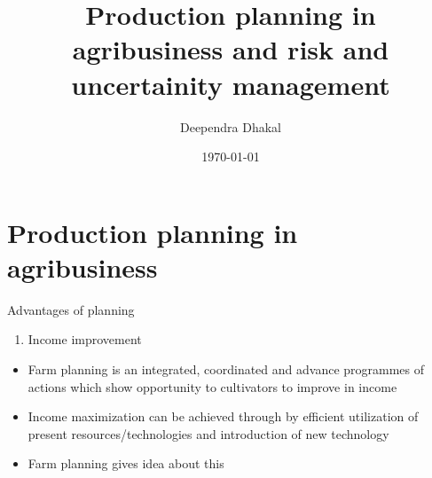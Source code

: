 \documentclass[12pt,ignorenonframetext,aspectratio=169]{beamer}
\title{\insertsectionhead}
  {
    \definecolor{white}{rgb}{0.776,0.357,0.157}
    \definecolor{iqss@orange}{rgb}{1,1,1}
    \ifnum \insertmainframenumber > \insertframenumber
    \frame{
      \frametitle{\iqsssectiontitleheader}
      \tableofcontents[currentsection]
    }
    \else
    \frame{
      \frametitle{Backup Slides}
      \tableofcontents[sectionstyle=shaded/shaded,subsectionstyle=shaded/shaded/shaded]
    }
    \fi
  }
\title[]{Production planning in agribusiness and risk and uncertainity
management}
\author[
        Deependra Dhakal
    ]{Deependra Dhakal}
\institute[
    ]{
    GAASC, Baitadi \and Tribhuwan University
    }
\date[
      \today
  ]{
      \today
        }
\providecommand{\tightlist}{%
  \setlength{\itemsep}{0pt}\setlength{\parskip}{0pt}}
\begin{document}
  \begin{frame}[plain]
  \titlepage
  \end{frame}



\hypertarget{production-planning-in-agribusiness}{%
\section{Production planning in
agribusiness}\label{production-planning-in-agribusiness}}


\begin{frame}{Advantages of planning}
\protect\hypertarget{advantages-of-planning}{}
\begin{enumerate}
\tightlist
\item
  Income improvement
\end{enumerate}

\begin{itemize}
\tightlist
\item
  Farm planning is an integrated, coordinated and advance programmes of
  actions which show opportunity to cultivators to improve in income
\item
  Income maximization can be achieved through by efficient utilization
  of present resources/technologies and introduction of new technology
\item
  Farm planning gives idea about this
\end{itemize}
\end{frame}
\end{document}
